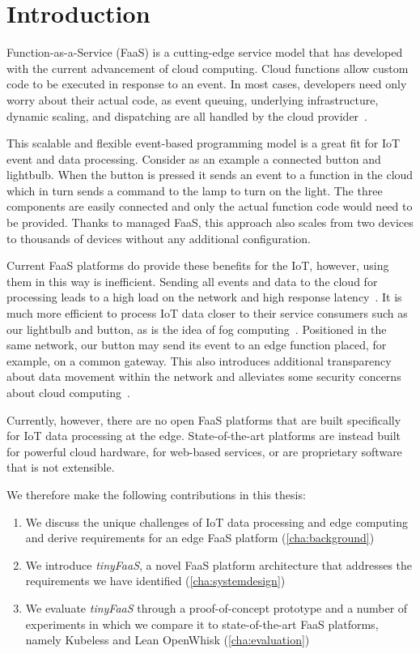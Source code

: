 \section{Introduction}
\label{cha:introduction}

Function-as-a-Service (FaaS) is a cutting-edge service model that has developed with the current advancement of cloud computing.
Cloud functions allow custom code to be executed in response to an event.
In most cases, developers need only worry about their actual code, as event queuing, underlying infrastructure, dynamic scaling, and dispatching are all handled by the cloud provider~\cite{Baldini2017-zf,McGrath2017-or}.

This scalable and flexible event-based programming model is a great fit for IoT event and data processing.
Consider as an example a connected button and lightbulb.
When the button is pressed it sends an event to a function in the cloud which in turn sends a command to the lamp to turn on the light.
The three components are easily connected and only the actual function code would need to be provided.
Thanks to managed FaaS, this approach also scales from two devices to thousands of devices without any additional configuration.

Current FaaS platforms do provide these benefits for the IoT, however, using them in this way is inefficient.
Sending all events and data to the cloud for processing leads to a high load on the network and high response latency~\cite{paper_zhang_cloud_is_not_enough_GDP,paper_bermbach_fog_computing}.
It is much more efficient to process IoT data closer to their service consumers such as our lightbulb and button, as is the idea of fog computing~\cite{Bermbach2020-sf,Pfandzelter2019-so}.
Positioned in the same network, our button may send its event to an edge function placed, for example, on a common gateway.
This also introduces additional transparency about data movement within the network and alleviates some security concerns about cloud computing~\cite{Bonomi2012-if,paper_bermbach_fog_computing}.

Currently, however, there are no open FaaS platforms that are built specifically for IoT data processing at the edge.
State-of-the-art platforms are instead built for powerful cloud hardware, for web-based services, or are proprietary software that is not extensible.

We therefore make the following contributions in this thesis:

\begin{enumerate}
    \item We discuss the unique challenges of IoT data processing and edge computing and derive requirements for an edge FaaS platform (\cref{cha:background})
    \item We introduce \textit{tinyFaaS}, a novel FaaS platform architecture that addresses the requirements we have identified (\cref{cha:systemdesign})
    \item We evaluate \textit{tinyFaaS} through a proof-of-concept prototype and a number of experiments in which we compare it to state-of-the-art FaaS platforms, namely Kubeless and Lean OpenWhisk (\cref{cha:evaluation})
\end{enumerate}
